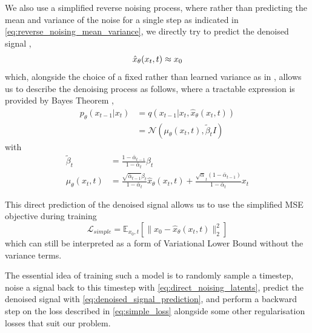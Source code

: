 We also use a simplified reverse noising process, where rather than predicting the mean and variance of the noise for a single step as indicated in \eqref{eq:reverse_noising_mean_variance}, we directly try to predict the denoised signal \cite{ramesh2022hierarchical},
\begin{equation}
    \label{eq:denoised_signal_prediction}
    \hat{x}_{\theta}(x_t, t) \approx x_0 \\
\end{equation}
which, alongside the choice of a fixed rather than learned variance as in \cite{ddpm}, allows us to describe the denoising process as follows, where a tractable expression is provided by Bayes Theorem \cite{improved_diffusion},
\begin{equation}
    \label{eq:direct_prediction_denoising}
    \begin{aligned}
    p_{\theta}(x_{t-1} | x_t) &= q(x_{t-1} | x_t, \hat{x}_{\theta}(x_t, t))  \\
    &= \mathcal{N}(\mu_{\theta}(x_t, t), \tilde{\beta}_t I)
    \end{aligned}
\end{equation}
with 
\begin{equation}
    \label{eq:direct_prediction_denoising_details}
    \begin{aligned}
    \tilde{\beta}_t &= \frac{1 - \bar{\alpha}_{t-1}}{1 - \bar{\alpha}_t} \beta_t \\
    \mu_{\theta}(x_t, t) &= \frac{\sqrt{\bar{\alpha}_{t-1}}\beta_t}{1-\bar{\alpha}_t}\hat{x}_{\theta}(x_t, t) + \frac{\sqrt{\alpha}_t(1-\bar{\alpha}_{t-1})}{1-\bar{\alpha}_t}x_t
    \end{aligned}
\end{equation}

This direct prediction of the denoised signal allows us to use the simplified MSE objective \cite{ddpm,ramesh2022hierarchical} during training
\begin{equation}
    \label{eq:simple_loss}
    \mathcal{L}_{simple} = \mathbb{E}_{x_0,t}\left[ \| x_0 - \hat{x}_{\theta}(x_t, t) \|_2^2 \right]
\end{equation}
which can still be interpreted as a form of Variational Lower Bound without the variance terms.

The essential idea of training such a model is to randomly sample a timestep, noise a signal back to this timestep with \eqref{eq:direct_noising_latents}, predict the denoised signal with \eqref{eq:denoised_signal_prediction}, and perform a backward step on the loss described in \eqref{eq:simple_loss} alongside some other regularisation losses that suit our problem.

